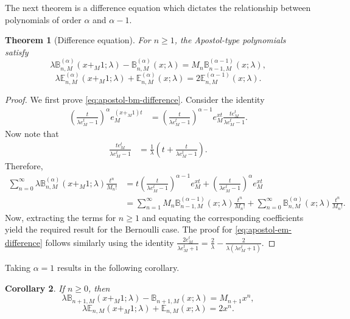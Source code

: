 \documentclass[12pt, a4paper]{article}
\newtheorem{theorem}{Theorem}[section]
\newtheorem{corollary}[theorem]{Corollary}
\theoremstyle{definition}
\numberwithin{equation}{section}
\newcommand{\B}{\mathbb{B}}
\newcommand{\E}{\mathbb{E}}
\begin{document}
The next theorem is a difference equation which dictates the relationship between polynomials of order $\alpha$ and $\alpha-1$.

\begin{theorem}[Difference equation]\label{thm:difference}
For $n\ge 1$, the Apostol-type polynomials satisfy
\begin{equation}\label{eq:apostol-bm-difference}
\lambda \B_{n,M}^{(\alpha)}(x+_M1;\lambda) - \B_{n,M}^{(\alpha)}(x;\lambda) = M_n \B_{n-1,M}^{(\alpha-1)}(x;\lambda),
\end{equation}
\begin{equation}\label{eq:apostol-em-difference}
\lambda \E_{n,M}^{(\alpha)}(x+_M1;\lambda) + \E_{n,M}^{(\alpha)}(x;\lambda) = 2 \E_{n,M}^{(\alpha-1)}(x;\lambda).
\end{equation}
\end{theorem}

\begin{proof}
We first prove \eqref{eq:apostol-bm-difference}. Consider the identity
\begin{align*}
\left(\frac{t}{\lambda e_M^t-1}\right)^\alpha e_M^{(x+_M1)t} &= \left(\frac{t}{\lambda e_M^t-1}\right)^{\alpha-1} e_M^{xt} \frac{t e_M^t}{\lambda e_M^t-1}.
\end{align*}
Now note that
\begin{align*}
\frac{t e_M^t}{\lambda e_M^t-1} &= \frac{1}{\lambda}\left(t + \frac{t}{\lambda e_M^t-1}\right).
\end{align*}
Therefore,
\begin{align*}
\sum_{n=0}^\infty \lambda\B_{n,M}^{(\alpha)}(x+_M1;\lambda)\frac{t^n}{M_n!} &= t\left(\frac{t}{\lambda e_M^t-1}\right)^{\alpha-1} e_M^{xt} + \left(\frac{t}{\lambda e_M^t-1}\right)^{\alpha} e_M^{xt} \\
&= \sum_{n=1}^\infty M_n \B_{n-1,M}^{(\alpha-1)}(x;\lambda)\frac{t^n}{M_n!} + \sum_{n=0}^\infty \B_{n,M}^{(\alpha)}(x;\lambda)\frac{t^n}{M_n!}.
\end{align*}
Now, extracting the terms for $n \geq 1$ and equating the corresponding coefficients yield the required result for the Bernoulli case. The proof for \eqref{eq:apostol-em-difference} follows similarly using the identity $\frac{2e_M^t}{\lambda e_M^t+1} = \frac{2}{\lambda} - \frac{2}{\lambda(\lambda e_M^t+1)}$.
\end{proof}
\noindent Taking $\alpha = 1$ results in the following corollary.
\begin{corollary} \label{th:numcol}
If $n \geq 0$, then
\[
\lambda \B_{n+1,M}(x+_M1;\lambda) - \B_{n+1,M}(x;\lambda) = M_{n+1} x^{n},
\]
\[
\lambda \E_{n,M}(x+_M1;\lambda) + \E_{n,M}(x;\lambda) = 2 x^n.
\]
\end{corollary}
\end{document}
